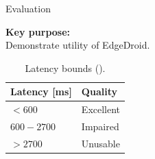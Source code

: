 \documentclass[aspectratio=1610]{beamer}
\begin{document}
\begin{frame}{Evaluation}
    \begin{center}
        \Large%
        \textbf{Key purpose:}\\
        Demonstrate utility of EdgeDroid.\\
    \end{center}
    \vspace{.1\textheight}
    \begin{table}[]
        \centering%
        \footnotesize%
        \caption{Latency bounds (\textcite{Chen:AnEmpiricalStudyOfLatency}).}%
        \label{my-label}%
        \begin{tabular}{@{}ll@{}}
            \toprule
            Latency {[}ms{]} & Quality   \\ \midrule
            $< 600$          & Excellent \\
            $600-2700$       & Impaired  \\
            $> 2700$         & Unusable  \\ \bottomrule
        \end{tabular}%
    \end{table}
\end{frame}
\end{document}
